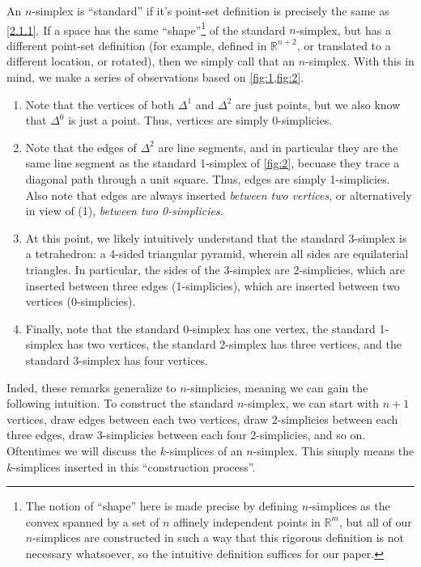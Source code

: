 \begin{remark}\label{2.1.5}
	An $n$-simplex is ``standard'' if it's point-set definition is precisely the same as \cref{2.1.1}. If a space has the same ``shape''\footnote{The notion of ``shape'' here is made precise by defining $n$-simplices as the convex spanned by a set of $n$ affinely independent points in $\mathbb{R} ^m$, but all of our $n$-simplices are constructed in such a way that this rigorous definition is not necessary whatsoever, so the intuitive definition suffices for our paper.} of the standard $n$-simplex, but has a different point-set definition (for example, defined in $\mathbb{R} ^{n+2} $, or translated to a different location, or rotated), then we simply call that an $n$-simplex. With this in mind, we make a series of observations based on \cref{fig:1,fig:2}.
    \begin{enumerate}
        \item Note that the vertices of both $\Delta^1$ and $\Delta^2$ are just points, but we also know that $\Delta^0$ is just a point. Thus, vertices are simply $0$-simplicies.
        \item Note that the edges of $\Delta^2$ are line segments, and in particular they are the same line segment as the standard 1-simplex of \cref{fig:2}, becuase they trace a diagonal path through a unit square. Thus, edges are simply 1-simplicies. Also note that edges are always inserted \emph{between two vertices}, or alternatively in view of (1), \emph{between two 0-simplicies}.
        \item At this point, we likely intuitively understand that the standard 3-simplex is a tetrahedron: a 4-sided triangular pyramid, wherein all sides are equilaterial triangles. In particular, the sides of the 3-simplex are 2-simplicies, which are inserted between three edges (1-simplicies), which are inserted between two vertices (0-simplicies).
        \item Finally, note that the standard 0-simplex has one vertex, the standard 1-simplex has two vertices, the standard 2-simplex has three vertices, and the standard 3-simplex has four vertices.
    \end{enumerate}
    Inded, these remarks generalize to $n$-simplicies, meaning we can gain the following intuition. To construct the standard $n$-simplex, we can start with $n+1$ vertices, draw edges between each two vertices, draw 2-simplicies between each three edges, draw 3-simplicies between each four 2-simplicies, and so on. Oftentimes we will discuss the $k$-simplices of an $n$-simplex. This simply means the $k$-simplices inserted in this ``construction process''.
\end{remark}

